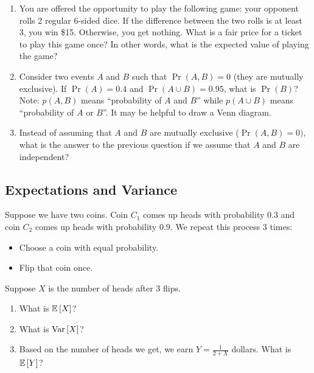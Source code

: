 \documentclass{article}
\begin{document}
\begin{enumerate}
    \item You are offered the opportunity to play the following game: your opponent rolls 2 regular 6-sided dice. If the difference between the two rolls is at least 3, you win \$15. Otherwise, you get nothing. What is a fair price for a ticket to play this game once? In other words, what is the expected value of playing the game?
    \solution{\newline \textcolor{blue}{\$5}}
    
    \item Consider two events $A$ and $B$ such that $\Pr(A, B)=0$ (they are mutually exclusive). If $\Pr(A) = 0.4$ and $\Pr(A \cup B) = 0.95$, what is $\Pr(B)$? Note: $p(A, B)$ means ``probability of $A$ and $B$'' while $p(A \cup B)$ means ``probability of $A$ or $B$''. It may be helpful to draw a Venn diagram.
    \solution{\newline \textcolor{blue}{0.55}}
    
    \item Instead of assuming that $A$ and $B$ are mutually exclusive ($\Pr(A,B) = 0)$, what is the answer to the previous question if we assume that $A$ and $B$ are independent?
    \solution{\newline \textcolor{blue}{0.917}}
\end{enumerate}


\subsection{Expectations and Variance}

Suppose we have two coins. Coin $C_1$ comes up heads with probability $0.3$ and coin $C_2$ comes up heads with probability $0.9$. We repeat this process 3 times:
\begin{itemize}
    \item Choose a coin with equal probability. 
    \item Flip that coin once. 
\end{itemize}

Suppose $X$ is the number of heads after 3 flips.
\begin{enumerate}
    \item What is $\mathbb{E}\left[X\right]$?
    \item What is $\text{Var}\left[X\right]$?
    \item Based on the number of heads we get, we earn $Y = \frac{1}{2 + X}$ dollars. 
    What is $\mathbb{E}\left[Y\right]$?
\end{enumerate}
\end{document}
